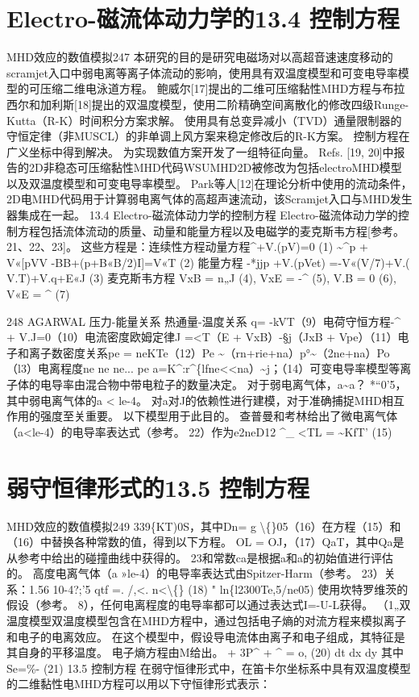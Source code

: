 \documentclass[UTF8,11pt,a4paper,openany,fontset=fandol]{ctexbook}
\begin{document}
\section{Electro-磁流体动力学的13.4 控制方程}
MHD效应的数值模拟247 本研究的目的是研究电磁场对以高超音速速度移动的scramjet入口中弱电离等离子体流动的影响，使用具有双温度模型和可变电导率模型的可压缩二维电泳道方程。 鲍威尔[17]提出的二维可压缩黏性MHD方程与布拉西尔和加利斯[18]提出的双温度模型，使用二阶精确空间离散化的修改四级Runge-Kutta（R-K）时间积分方案求解。 使用具有总变异减小（TVD）通量限制器的守恒定律（非MUSCL）的非单调上风方案来稳定修改后的R-K方案。 控制方程在广义坐标中得到解决。 为实现数值方案开发了一组特征向量。 Refs. [19, 20]中报告的2D非稳态可压缩黏性MHD代码WSUMHD2D被修改为包括electroMHD模型以及双温度模型和可变电导率模型。 Park等人[12]在理论分析中使用的流动条件，2D电MHD代码用于计算弱电离气体的高超声速流动，该Scramjet入口与MHD发生器集成在一起。 13.4 Electro-磁流体动力学的控制方程 Electro-磁流体动力学的控制方程包括流体流动的质量、动量和能量方程以及电磁学的麦克斯韦方程[参考。 21、22、23]。 这些方程是：连续性方程动量方程\textasciicircum{}+V.(pV)=0 (1) \textasciitilde{}\textasciicircum{}p + V«[pVV -BB+(p+B«B/2)I]=V«T (2) 能量方程 -*jjp +V.(pVet) =-V«(V/7)+V.( V.T)+V.q+E«J (3) 麦克斯韦方程 VxB = n„J (4), VxE = -\textasciicircum{} (5), V.B = 0 (6), V«E = \textasciicircum{} (7)

248 AGARWAL 压力-能量关系 热通量-温度关系 q= -kVT（9）电荷守恒方程-\textasciicircum{} + V.J=0（10）电流密度欧姆定律J =<T（E + VxB）-§j（JxB + Vpe）（11）电子和离子数密度关系pe = neKTe（12）Pe \textasciitilde{}（rn+rie+na）p°\textasciitilde{}（2ne+na）Po（l3）电离程度ne ne ne... pe a=K\textasciicircum{}:r\textasciicircum{}\{lfne<<na）\textasciitilde{}j；（14）可变电导率模型等离子体的电导率由混合物中带电粒子的数量决定。 对于弱电离气体，a\textasciitilde{}a？ *“0'5，其中弱电离气体的a < le-4。 对a对J的依赖性进行建模，对于准确捕捉MHD相互作用的强度至关重要。 以下模型用于此目的。 查普曼和考林给出了微电离气体（a<le-4）的电导率表达式（参考。 22）作为e2neD12 \textasciicircum{}\_ <TL = \textasciitilde{}KfT' (15)

\section{弱守恒律形式的13.5 控制方程}
MHD效应的数值模拟249 339\{KT)0S，其中Dn= g \textbackslash\{\}05（16）在方程（15）和（16）中替换各种常数的值，得到以下方程。 OL = OJ，（17）QaT，其中Qa是从参考中给出的碰撞曲线中获得的。 23和常数ca是根据a和a的初始值进行评估的。 高度电离气体（a »le-4）的电导率表达式由Spitzer-Harm（参考。 23）关系：1.56 10-4?;'5 qtf =. /,<. n<\textbackslash\{\} (18) " ln\{l2300Te,5/ne05) 使用坎特罗维茨的假设（参考。 8），任何电离程度的电导率都可以通过表达式I=-U-L获得。 （1„双温度模型双温度模型包含在MHD方程中，通过包括电子熵的对流方程来模拟离子和电子的电离效应。 在这个模型中，假设导电流体由离子和电子组成，其特征是其自身的平移温度。 电子熵方程由M给出。 + 3P\textasciicircum{} + \textasciicircum{} = o, (20) dt dx dy 其中Se=\%- (21) 13.5 控制方程 在弱守恒律形式中，在笛卡尔坐标系中具有双温度模型的二维黏性电MHD方程可以用以下守恒律形式表示：
\end{document}
